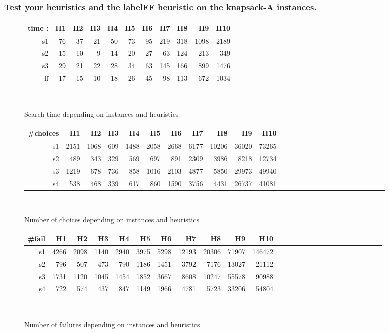 \documentclass[a4paper ,12pt,french]{article}
\begin{document}
\subsubsection{Test your heuristics and the labelFF heuristic on the knapsack-A instances.}

\begin{figure}[!h]
\begin{tabular}{|r||r|r|r|r|r|r|r|r|r|r|r|r|r|r|r|r|r|r|r|r|r|r|r|r|r|}
\hline
time :&H1&H2&H3&H4&H5&H6&H7&H8&H9&H10\\
\hline
\hline
s1&76&37&21&50&73&95&219&318&1098&2189\\
\hline
s2&15&10&9&14&20&27&63&124&213&349\\
\hline
s3&29&21&22&28&34&63&145&166&899&1476\\
\hline
ff&17&15&10&18&26&45&98&113&672&1034\\
\hline
\end{tabular}\\
\caption{Search time depending on instances and heuristics}
\end{figure}


\begin{figure}[!h]
\begin{tabular}{|r||r|r|r|r|r|r|r|r|r|r|r|r|r|r|r|r|r|r|r|r|r|r|r|r|r|}
\hline
\#choices&H1&H2&H3&H4&H5&H6&H7&H8&H9&H10\\
\hline
\hline
s1&2151&1068&609&1488&2058&2668&6177&10206&36020&73265\\
\hline
s2&489&343&329&569&697&891&2309&3986&8218&12734\\
\hline
s3&1219&678&736&858&1016&2103&4877&5850&29973&49940\\
\hline
s4&538&468&339&617&860&1590&3756&4431&26737&41081\\
\hline

\end{tabular}\\
\caption{Number of choices depending on instances and heuristics}
\end{figure}

\begin{figure}[!h]
\begin{tabular}{|r||r|r|r|r|r|r|r|r|r|r|r|r|r|r|r|r|r|r|r|r|r|r|r|r|r|}
\hline
\#fail&H1&H2&H3&H4&H5&H6&H7&H8&H9&H10\\
\hline
\hline
s1&4266&2098&1140&2940&3975&5298&12193&20306&71907&146472\\
\hline
s2&796&507&473&790&1186&1451&3792&7176&13027&21112\\
\hline
s3&1731&1120&1045&1454&1852&3667&8608&10247&55578&90988\\
\hline
s4&722&574&437&847&1149&1966&4781&5723&33206&54804\\
\hline
\end{tabular}\\
\caption{Number of failures depending on instances and heuristics}
\end{figure}
\end{document}
